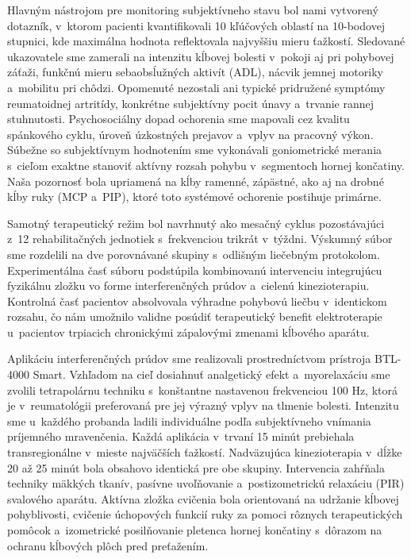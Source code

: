 Hlavným nástrojom pre monitoring subjektívneho stavu bol nami vytvorený dotazník, v~ktorom pacienti kvantifikovali 10 kľúčových oblastí na 10-bodovej stupnici, kde maximálna hodnota reflektovala najvyššiu mieru ťažkostí. Sledované ukazovatele sme zamerali na intenzitu kĺbovej bolesti v~pokoji aj pri pohybovej záťaži, funkčnú mieru sebaobsĺužných aktivít (ADL), nácvik jemnej motoriky a~mobilitu pri chôdzi. Opomenuté nezostali ani typické pridružené symptómy reumatoidnej artritídy, konkrétne subjektívny pocit únavy a~trvanie rannej stuhnutosti. Psychosociálny dopad ochorenia sme mapovali cez kvalitu spánkového cyklu, úroveň úzkostných prejavov a~vplyv na pracovný výkon. Súbežne so subjektívnym hodnotením sme vykonávali goniometrické merania s~cieľom exaktne stanoviť aktívny rozsah pohybu v~segmentoch hornej končatiny. Naša pozornosť bola upriamená na kĺby ramenné, zápästné, ako aj na drobné kĺby ruky (MCP a~PIP), ktoré toto systémové ochorenie postihuje primárne.

Samotný terapeutický režim bol navrhnutý ako mesačný cyklus pozostávajúci z~12 rehabilitačných jednotiek s~frekvenciou trikrát v~týždni. Výskumný súbor sme rozdelili na dve porovnávané skupiny s~odlišným liečebným protokolom. Experimentálna časť súboru podstúpila kombinovanú intervenciu integrujúcu fyzikálnu zložku vo forme interferenčných prúdov a~cielenú kinezioterapiu. Kontrolná časť pacientov absolvovala výhradne pohybovú liečbu v~identickom rozsahu, čo nám umožnilo validne posúdiť terapeutický benefit elektroterapie u~pacientov trpiacich chronickými zápalovými zmenami kĺbového aparátu.

Aplikáciu interferenčných prúdov sme realizovali prostredníctvom prístroja BTL-4000 Smart. Vzhľadom na cieľ dosiahnuť analgetický efekt a~myorelaxáciu sme zvolili tetrapolárnu techniku s~konštantne nastavenou frekvenciou 100 Hz, ktorá je v~reumatológii preferovaná pre jej výrazný vplyv na tlmenie bolesti. Intenzitu sme u~každého probanda ladili individuálne podľa subjektívneho vnímania príjemného mravenčenia. Každá aplikácia v~trvaní 15 minút prebiehala transregionálne v~mieste najväčších ťažkostí. Nadväzujúca kinezioterapia v~dĺžke 20 až 25 minút bola obsahovo identická pre obe skupiny. Intervencia zahŕňala techniky mäkkých tkanív, pasívne uvoľňovanie a~postizometrickú relaxáciu (PIR) svalového aparátu. Aktívna zložka cvičenia bola orientovaná na udržanie kĺbovej pohyblivosti, cvičenie úchopových funkcií ruky za pomoci rôznych terapeutických pomôcok a~izometrické posilňovanie pletenca hornej končatiny s~dôrazom na ochranu kĺbových plôch pred preťažením.

